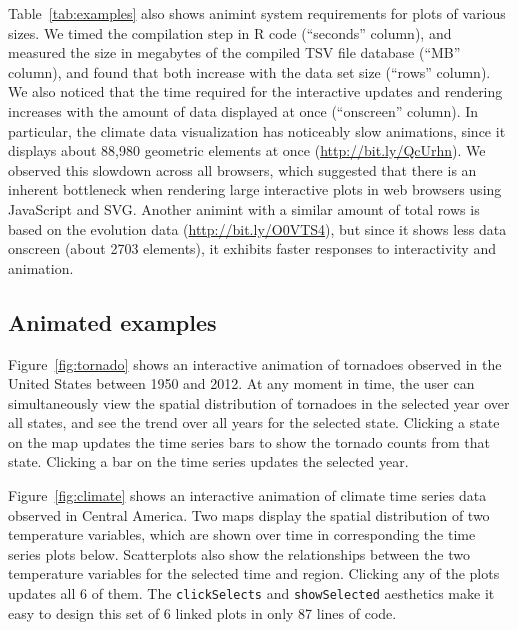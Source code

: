 \documentclass[journal]{vgtc}\usepackage[]{graphicx}\usepackage[]{color}
\begin{document}
Table~\ref{tab:examples} also shows animint system requirements for
plots of various sizes. We timed the compilation step in R code
(``seconds'' column), and measured the size in megabytes of the
compiled TSV file database (``MB'' column), and found that both
increase with the data set size (``rows'' column).
We also noticed that the time required for the interactive updates and
rendering increases with the amount of data displayed at once
(``onscreen'' column). In particular, the climate data visualization
has noticeably slow animations, since it displays about 88,980
geometric elements at once (\url{http://bit.ly/QcUrhn}). We observed
this slowdown across all browsers, which suggested that there is an
inherent bottleneck when rendering large interactive plots in web
browsers using JavaScript and SVG. Another animint with a similar
amount of total rows is based on the evolution data
(\url{http://bit.ly/O0VTS4}), but since it shows less data onscreen
(about 2703 elements), it exhibits faster responses to interactivity
and animation.

\subsection{Animated examples}

Figure~\ref{fig:tornado} shows an interactive animation of tornadoes
observed in the United States between 1950 and 2012. At any moment in
time, the user can simultaneously view the spatial distribution of
tornadoes in the selected year over all states, and see the trend over
all years for the selected state. Clicking a state on the map updates the
time series bars to show the tornado counts from that state. Clicking
a bar on the time series updates the selected year.

Figure~\ref{fig:climate} shows an interactive animation of climate
time series data observed in Central America. Two maps display the
spatial distribution of two temperature variables, which are shown
over time in corresponding the time series plots below. Scatterplots
also show the relationships between the two temperature variables for
the selected time and region. Clicking any of the plots updates all 6
of them. The \texttt{clickSelects} and \texttt{showSelected} aesthetics make it easy to
design this set of 6 linked plots in only 87 lines of code.
\end{document}
